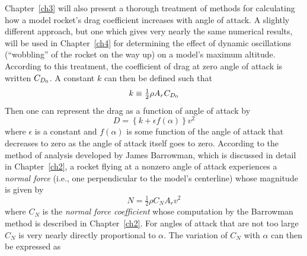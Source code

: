 Chapter~\ref{ch3} will also present a thorough treatment of methods for
calculating how a model rocket's drag coefficient increases with angle of
attack. A slightly different approach, but one which gives very nearly the same
numerical results, will be used in Chapter~\ref{ch4} for determining the effect
of dynamic oscillations (``wobbling'' of the rocket on the way up) on a model's
maximum altitude. According to this treatment, the coefficient of drag at zero
angle of attack is written $C_{D_0}$. A constant $k$ can then be defined such that
\begin{equation}\label{ch1:eq:18}
k \equiv \tfrac{1}{2}\rho A_r C_{D_0}
\end{equation}
Then one can represent the drag as a function of angle of attack by
\begin{equation}\label{ch1:eq:19}
D = \left\{k + \epsilon f(\alpha)\right\} v^{2}
\end{equation}
where $\epsilon$ is a constant and $f(\alpha)$ is some function of the angle of
attack that decreases to zero as the angle of attack itself goes to zero.
According to the method of analysis developed by James Barrowman, which is
discussed in detail in Chapter~\ref{ch2}, a rocket flying at a nonzero angle of
attack experiences a \emph{normal force} (i.e., one perpendicular to the
model's centerline) whose magnitude is given by
\begin{equation}\label{ch1:eq:20}
N = \tfrac{1}{2}\rho C_N A_r v^{2}
\end{equation}
where $C_N$ is the \emph{normal force coefficient} whose computation by the
Barrowman method is described in Chapter~\ref{ch2}. For angles of attack that
are not too large $C_N$ is very nearly directly proportional to $\alpha$. The
variation of $C_N$ with $\alpha$ can then be expressed as
